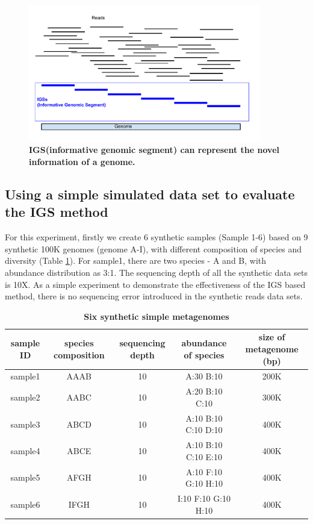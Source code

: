 \documentclass{article}
\begin{document}
\begin{figure}[!ht]
\centerline{\includegraphics[width=4in]{./figures/IGSs_figure.pdf}}
\caption{\bf IGS(informative genomic segment) can represent the novel information of a genome.}
\label{fig:IGS}
\end{figure}





\subsection{Using a simple simulated data set to evaluate the IGS method}


For this experiment, firstly we create 6 synthetic samples (Sample 1-6) 
based on 9 synthetic 100K genomes (genome A-I), with different composition of species and diversity
(Table \ref{table:simulated_metag}). For sample1, there are two species - A and B, with abundance distribution as 3:1.
The sequencing depth of all the synthetic data sets is 10X. 
As a simple experiment to demonstrate the effectiveness of the IGS based method, 
there is no sequencing error introduced in the 
synthetic reads data sets.

\begin{table}[!ht]
\centering
\resizebox{16cm}{!} {
\begin{tabular}{ |c | c |c| c|c| }
\hline
sample ID & species composition & sequencing depth & abundance of species & size of metagenome (bp)\\
\hline
sample1        & AAAB & 10 & A:30 B:10 & 200K\\
sample2        & AABC & 10 & A:20 B:10 C:10 & 300K\\
sample3        & ABCD & 10 & A:10 B:10 C:10 D:10 & 400K\\
sample4        & ABCE & 10 & A:10 B:10 C:10 E:10 & 400K\\
sample5        & AFGH & 10 & A:10 F:10 G:10 H:10 & 400K\\
sample6        & IFGH & 10 & I:10 F:10 G:10 H:10 & 400K\\
\hline
\end{tabular}
}
\caption{
\bf{Six synthetic simple metagenomes}
}
\label{table:simulated_metag}
\end{table}
\end{document}
